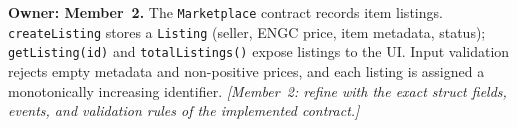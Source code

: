 \textbf{Owner: Member~2.} The \texttt{Marketplace} contract records item listings. \texttt{createListing} stores a \texttt{Listing} (seller, ENGC price, item metadata, status); \texttt{getListing(id)} and \texttt{totalListings()} expose listings to the UI. Input validation rejects empty metadata and non-positive prices, and each listing is assigned a monotonically increasing identifier. \emph{[Member~2: refine with the exact struct fields, events, and validation rules of the implemented contract.]}
